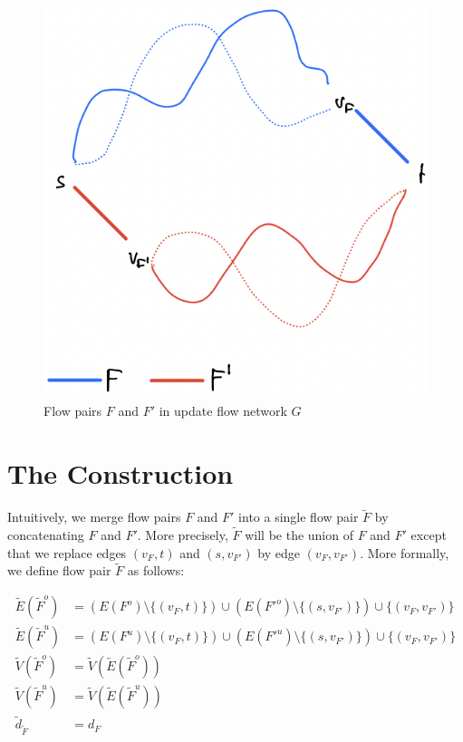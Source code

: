 \documentclass[fontsize=11pt,paper=a4]{book}
\begin{document}
\begin{figure}[htbp]
\centering
\includegraphics[width=.9\linewidth]{../assets/Screen Shot 2023-02-19 at 13.28.41.png}
\caption{\label{fig:org219d26f}Flow pairs \(F\) and \(F'\) in update flow network \(G\)}
\end{figure}

\section{The Construction}
\label{sec:orgca8bcc5}

Intuitively, we merge flow pairs \(F\) and \(F'\) into a single flow pair \(\tilde{F}\) by concatenating \(F\) and \(F'\).
More precisely, \(\tilde{F}\) will be the union of \(F\) and \(F'\) except that we replace edges \((v_F,t)\) and \((s,v_{F'})\) by edge \((v_F,v_{F'})\).
More formally, we define flow pair \(\tilde{F}\) as follows:

\begin{align*}
\tilde{E}(\tilde{F}^o)&=\left(E(F^o)\setminus\{(v_F,t)\}\right)\cup\left(E(F'^o)\setminus\{(s,v_{F'})\}\right)\cup\{(v_F,v_{F'})\}\\
\tilde{E}(\tilde{F}^u)&=\left(E(F^u)\setminus\{(v_F,t)\}\right)\cup\left(E(F'^u)\setminus\{(s,v_{F'})\}\right)\cup\{(v_F,v_{F'})\}\\
\tilde{V}(\tilde{F}^o)&=\tilde{V}(\tilde{E}(\tilde{F}^o))\\
\tilde{V}(\tilde{F}^u)&=\tilde{V}(\tilde{E}(\tilde{F}^u))\\
\tilde{d}_{\tilde{F}}&=d_F
\end{align*}
\end{document}
